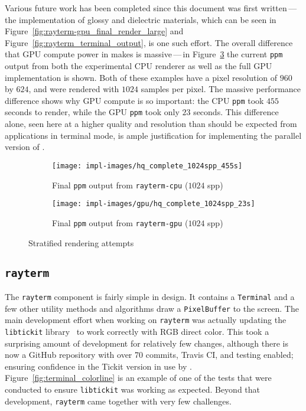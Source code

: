 Various future work has been completed since this document was first written\,---\,the implementation of glossy and dielectric materials, which can be seen in Figure~\ref{fig:rayterm-gpu_final_render_large} and Figure~\ref{fig:rayterm_terminal_output}, is one such effort.
The overall difference that GPU compute power in \name{} makes is massive\,---\,in Figure~\ref{fig:rayterm_final_ppm_outputs} the current \texttt{ppm} output from both the experimental CPU renderer as well as the full GPU \name{} implementation is shown.
Both of these examples have a pixel resolution of $960$ by $624$, and were rendered with $1024$ samples per pixel.
The massive performance difference shows why GPU compute is so important: the CPU \texttt{ppm} took $455$ seconds to render, while the GPU \texttt{ppm} took only $23$ seconds.
This difference alone, seen here at a higher quality and resolution than should be expected from applications in terminal mode, is ample justification for implementing the parallel version of \name{}.

\vspace{0.3em}
\begin{figure}[htb]
  \centering
  \begin{subfigure}[htb]{0.45\textwidth}
    \texttt{[image: impl-images/hq\_complete\_1024spp\_455s]}
    \caption{Final \texttt{ppm} output from \texttt{rayterm-cpu} ($1024$ spp)}
\label{fig:rayterm-cpu_final_ppm_output}
  \end{subfigure}
  \begin{subfigure}[htb]{0.45\textwidth}
    \texttt{[image: impl-images/gpu/hq\_complete\_1024spp\_23s]}
    \caption{Final \texttt{ppm} output from \texttt{rayterm-gpu} ($1024$ spp)}
\label{fig:rayterm-gpu_final_ppm_output}
  \end{subfigure}
  \caption{Stratified rendering attempts}
\label{fig:rayterm_final_ppm_outputs}
\end{figure}

\subsection{\texttt{rayterm}}\label{ch:implementation:final:rayterm}

The \texttt{rayterm} component is fairly simple in design.
It contains a \texttt{Terminal} and a few other utility methods and algorithms draw a \texttt{PixelBuffer} to the screen.
The main development effort when working on \texttt{rayterm} was actually updating the \texttt{libtickit} library~\cite{libtickitLibrary, libtickitCustom} to work correctly with RGB direct color.
This took a surprising amount of development for relatively few changes, although there is now a GitHub repository with over 70 commits, Travis CI, and testing enabled; ensuring confidence in the Tickit version in use by \name{}.
Figure~\ref{fig:terminal_colorline} is an example of one of the tests that were conducted to ensure \texttt{libtickit} was working as expected.
Beyond that development, \texttt{rayterm} came together with very few challenges.

